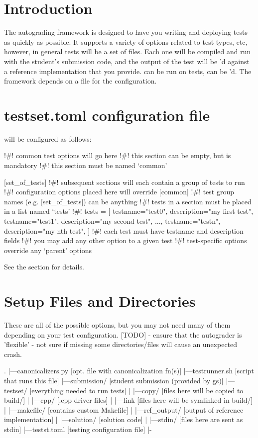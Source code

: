 \documentclass[11pt]{report}
\begin{document}
\section*{Introduction}
The autograding framework is designed to have you writing and deploying tests as quickly as possible. 
It supports a variety of options related to test types, etc, however, in general tests will be a 
set of  files. Each one will be compiled and run with the student's submission code,
and the output of the test will be 'd against a reference implementation that you provide.
 can be run on tests,  can be 'd. The framework depends on a
 file for the configuration. 
\section*{testset.toml configuration file}
 will be configured as follows:
\begin{bashcodeblock}
[common]
!\#! common test options will go here
!\#! this section can be empty, but is mandatory
!\#! this section must be named `common' 

[set_of_tests] 
!\#! subsequent sections will each contain a group of tests to run
!\#! configuration options placed here will override [common]
!\#! test group names (e.g. [set_of_tests]) can be anything
!\#! tests in a section must be placed in a list named `tests'
!\#! tests = [
      {testname="test0", description="my first test"},
      {testname="test1", description="my second test"},
      ..., 
      {testname="testn", description="my nth test"},
]
!\#! each test must have testname and description fields
!\#! you may add any other option to a given test
!\#! test-specific options override any `parent' options
\end{bashcodeblock}
See the section  for details. 

\section*{Setup Files and Directories}
These are all of the possible options, but you may not need many of them 
depending on your test configuration.
[TODO] - ensure that the autograder is 'flexible' - not sure if missing some directories/files will
cause an unexpected crash.
\begin{bashcodeblock}
.
|---canonicalizers.py [opt. file with canonicalization fn(s)]
|---testrunner.sh     [script that runs this file]
|---submission/       [student submission (provided by gs)]
|---testset/          [everything needed to run tests]
|   |---copy/         [files here will be copied to build/]
|   |---cpp/          [.cpp driver files]
|   |---link          [files here will be symlinked in build/]
|   |---makefile/     [contains custom Makefile]
|   |---ref_output/   [output of reference implementation]
|   |---solution/     [solution code]
|   |---stdin/        [files here are sent as stdin]
|---testst.toml       [testing configuration file]
|-
\end{bashcodeblock}
\end{document}
